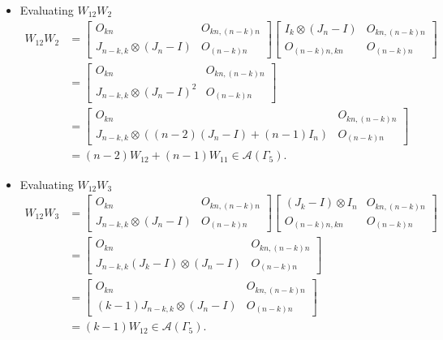 \begin{itemize}
\item Evaluating $W_{12}W_{2}$
\begin{align*}
    W_{12}W_{2}
    &= \begin{bmatrix}
        O_{kn} & O_{kn, (n-k)n} \\
        J_{n-k, k}\otimes (J_n-I) & O_{(n-k)n}
    \end{bmatrix}
    \begin{bmatrix}
        I_k\otimes(J_n-I) & O_{kn, (n-k)n} \\
        O_{(n-k)n,kn} & O_{(n-k)n}
    \end{bmatrix}\\
    &= \begin{bmatrix}
        O_{kn} & O_{kn, (n-k)n} \\
        J_{n-k, k}\otimes (J_n-I)^2 & O_{(n-k)n}
    \end{bmatrix}\\
    &= \begin{bmatrix}
        O_{kn} & O_{kn, (n-k)n} \\
        J_{n-k, k}\otimes ((n-2)(J_n-I) + (n-1)I_n) & O_{(n-k)n}
    \end{bmatrix}\\
    &= (n-2)W_{12} +(n-1)W_{11}\in\mathcal{A}(\Gamma_5).
\end{align*}

\item Evaluating $W_{12}W_{3}$
\begin{align*}
    W_{12}W_{3}
    &= \begin{bmatrix}
        O_{kn} & O_{kn, (n-k)n} \\
        J_{n-k, k}\otimes (J_n-I) & O_{(n-k)n}
    \end{bmatrix}
    \begin{bmatrix}
        (J_k-I)\otimes I_n & O_{kn, (n-k)n} \\
        O_{(n-k)n,kn} & O_{(n-k)n}
    \end{bmatrix}\\
    &= \begin{bmatrix}
        O_{kn} & O_{kn, (n-k)n} \\
        J_{n-k, k}(J_k-I)\otimes (J_n-I) & O_{(n-k)n}
    \end{bmatrix}\\
    &= \begin{bmatrix}
        O_{kn} & O_{kn, (n-k)n} \\
        (k-1)J_{n-k, k}\otimes (J_n-I) & O_{(n-k)n}
    \end{bmatrix}\\
    &= (k-1)W_{12}\in\mathcal{A}(\Gamma_5).
\end{align*}


\end{itemize}
